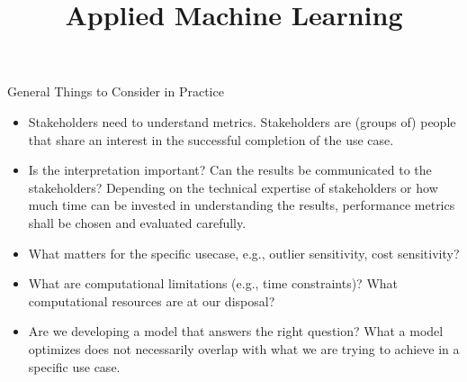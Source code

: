 \documentclass[11pt,compress,t,notes=noshow, aspectratio=169, xcolor=table]{beamer}
\title{Applied Machine Learning}
\date{}
\begin{document}
\newcommand{\titlefigure}{figure/empty}
\newcommand{\learninggoals}{
\item What to watch out for in practice
\item Pros and cons of performance metrics
\item Advanced evaluation practices}



\begin{frame}{General Things to Consider in Practice}

\begin{itemize}
\setlength\itemsep{2em}
    \item Stakeholders need to understand metrics. Stakeholders are (groups of) people that share an interest in the successful completion of the use case. 
    \item Is the interpretation important? Can the results be communicated to the stakeholders? Depending on the technical expertise of stakeholders or how much time can be invested in understanding the results, performance metrics shall be chosen and evaluated carefully.
    \item What matters for the specific usecase, e.g., outlier sensitivity, cost sensitivity?
    \item What are computational limitations (e.g., time constraints)? What computational resources are at our disposal?
    \item Are we developing a model that answers the right question? What a model optimizes does not necessarily overlap with what we are trying to achieve in a specific use case.
\end{itemize}
\end{frame}
\end{document}
